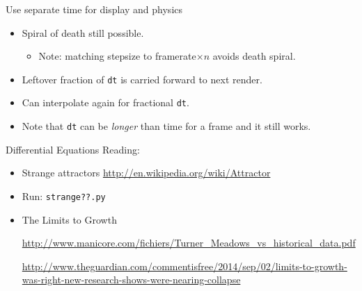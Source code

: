 \documentclass[handout,t,compress]{beamer}
\newcommand{\bframe}[1]{\begin{frame}[fragile]{#1}}
\begin{document}
\bframe{Use separate time for display and physics}
\begin{itemize}
  \begin{Verbatim}[frame=single]
framerate = 30.0
rendertime, physicstime = 0.0, 0.0
dt = 0.01
while !quitting:
  rendertime += clock.tick(framerate) * 0.001
  handle.input()
  while (physicstime < rendertime):
    integrate(state, physicstime, dt)
    physicstime += dt
  display()
\end{Verbatim}
\item Spiral of death still possible.
  \begin{itemize}
  \item Note: matching stepsize to framerate$\times n$ avoids death spiral.
  \end{itemize}
  
  \item Leftover fraction of {\tt dt} is carried forward to next
    render. 
  \item Can interpolate again for fractional {\tt dt}.
\item Note that {\tt dt} can be {\em longer} than time for a frame and it still
  works.
\end{itemize}
\end{frame}


\bframe{Differential Equations}
Reading:
\begin{itemize}
\item Strange attractors
\url{http://en.wikipedia.org/wiki/Attractor}

\item Run: {\tt strange??.py}

\item The Limits to Growth

{
\tiny

\setlength{\parindent}{-1cm}

\url{http://www.manicore.com/fichiers/Turner_Meadows_vs_historical_data.pdf}


\url{http://www.theguardian.com/commentisfree/2014/sep/02/limits-to-growth-was-right-new-research-shows-were-nearing-collapse}


}

\end{itemize}
\end{frame}
\end{document}
